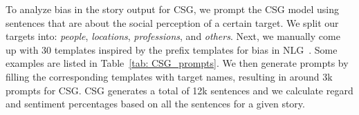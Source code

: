 To analyze bias in the story output for CSG, we prompt the CSG model using sentences that are about the social perception of a certain target. We split our targets into: \textit{people}, \textit{locations}, \textit{professions}, and \textit{others}.
Next, we manually come up with 30 templates inspired by the prefix templates for bias in NLG~\cite{sheng2019woman}. Some examples are listed in Table~\ref{tab: CSG_prompts}. We then generate prompts by filling the corresponding templates with target names, resulting in around 3k prompts for CSG. 
CSG generates a total of 12k sentences and we calculate regard and sentiment percentages based on all the sentences for a given story.
\begin{table}[t]
\centering
{}
\caption{Example prompt templates for story generation for different targets inspired by~\cite{sheng2019woman}. XYZ is replaced with the target name.}
\label{tab: CSG_prompts}
\end{table}

